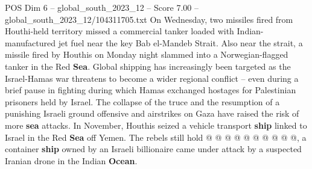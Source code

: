 \begin{textsample}{POS Dim 6 – global\_south\_2023\_12 – Score 7.00 – global\_south\_2023\_12/104311705.txt}
On Wednesday, two missiles fired from Houthi-held territory missed a commercial tanker loaded with Indian-manufactured jet fuel near the key Bab el-Mandeb Strait.
Also near the strait, a missile fired by Houthis on Monday night slammed into a Norwegian-flagged tanker in the Red \textbf{Sea}.
Global shipping has increasingly been targeted as the Israel-Hamas war threatens to become a wider regional conflict -- even during a brief pause in fighting during which Hamas exchanged hostages for Palestinian prisoners held by Israel.
The collapse of the truce and the resumption of a punishing Israeli ground offensive and airstrikes on Gaza have raised the risk of more \textbf{sea} attacks.
In November, Houthis seized a vehicle transport \textbf{ship} linked to Israel in the Red \textbf{Sea} off Yemen.
The rebels still hold @ @ @ @ @ @ @ @ @ @, a container \textbf{ship} owned by an Israeli billionaire came under attack by a suspected Iranian drone in the Indian \textbf{Ocean}.

\end{textsample}
